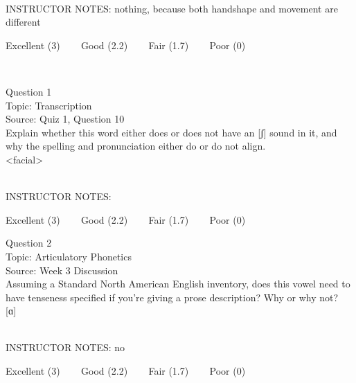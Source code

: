 \documentclass[12pt]{article}
\begin{document}
~\\
INSTRUCTOR NOTES: nothing, because both handshape and movement are different


\vfill
Excellent (3) ~~~ Good (2.2) ~~~ Fair (1.7) ~~~ Poor (0)
\newpage

\begin{center}
\textbf{{\color{red}{\HUGE END OF EXAM}}}\\

\end{center}
\newpage

\begin{center}
\textbf{{\color{blue}{\HUGE START OF EXAM\\}}}

\textbf{{\color{blue}{\HUGE Student ID: 11061\\}}}

\textbf{{\color{blue}{\HUGE \\}}}

\end{center}
\newpage

{\large Question 1}\\

Topic: Transcription\\
Source: Quiz 1, Question 10\\

Explain whether this word either does or does not have an [ʃ] sound in it, and why the spelling and pronunciation either do or do not align.\\

<facial>


~\\
INSTRUCTOR NOTES: 


\vfill
Excellent (3) ~~~ Good (2.2) ~~~ Fair (1.7) ~~~ Poor (0)
\newpage

{\large Question 2}\\

Topic: Articulatory Phonetics\\
Source: Week 3 Discussion\\

Assuming a Standard North American English inventory, does this vowel need to have tenseness specified if you're giving a prose description? Why or why not?\\

{[ɑ]}


~\\
INSTRUCTOR NOTES: no


\vfill
Excellent (3) ~~~ Good (2.2) ~~~ Fair (1.7) ~~~ Poor (0)
\newpage
\end{document}
